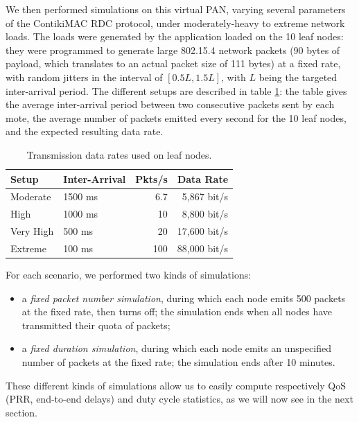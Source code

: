 \documentclass[conference]{IEEEtran}
\begin{document}
We then performed simulations on this virtual PAN, varying several parameters
of the ContikiMAC RDC protocol, under moderately-heavy to extreme network
loads. The loads were generated by the application loaded on the 10 leaf
nodes: they were programmed to generate large 802.15.4 network packets
(90 bytes of payload, which translates to an actual packet size of
111 bytes) at a fixed rate, with random jitters in the interval of
$[ 0.5 L , 1.5  L ]$, with $L$ being the targeted inter-arrival
period. The different setups are described in table \ref{TblDataRates}:
the table gives the average inter-arrival period between two consecutive
packets sent by each mote, the average number of packets emitted every
second for the 10 leaf nodes, and the expected resulting data rate.

\begin{table}[htb]
\centering
\begin{tabular}{|l|p{1.25cm}|r|r|}
\hline
Setup     &  Inter-Arrival  & Pkts/s & Data Rate \\
\hline
Moderate  & 1500 ms &   6.7  &  5,867 bit/s \\ 
High      & 1000 ms &  10    &  8,800 bit/s \\
Very High &  500 ms &  20    & 17,600 bit/s \\
Extreme   &  100 ms & 100    & 88,000 bit/s \\
\hline
\end{tabular}
\caption{Transmission data rates used on leaf nodes.}
\label{TblDataRates}
\end{table}

For each scenario, we performed two kinds of simulations:
\begin{itemize}
\item a \emph{fixed packet number simulation}, during which each node emits
500 packets at the fixed rate, then turns off; the simulation ends when all
nodes have transmitted their quota of packets;

\item a \emph{fixed duration simulation}, during which each node emits an
unspecified number of packets at the fixed rate; the simulation ends after
10 minutes.
\end{itemize}

These different kinds of simulations allow us to easily compute respectively
QoS (PRR, end-to-end delays) and duty cycle statistics, as we will now see
in the next section.


\end{document}
